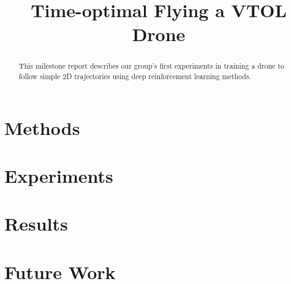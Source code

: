 \documentclass[conference]{IEEEtran}
\begin{document}
\title{Time-optimal Flying a VTOL Drone}

\author{
\and
{}






}

\maketitle




\begin{abstract}

This milestone report describes our group's first experiments in training a drone to follow simple 2D trajectories using deep reinforcement learning methods.

\end{abstract}


\section{Methods}
\label{sec:methods}


\section{Experiments}
\label{sec:experiments}


\section{Results}


\section{Future Work}









\end{document}
